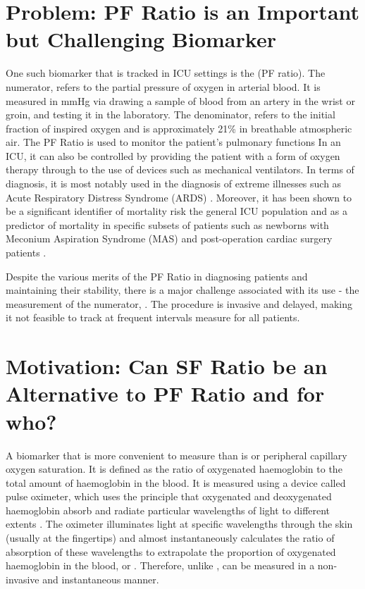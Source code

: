 \section{Problem: PF Ratio is an Important but Challenging Biomarker}

One such biomarker that is tracked in ICU settings is the  \PF(PF ratio). The numerator, \Pa refers to the partial pressure of oxygen in arterial blood. It is measured in mmHg via drawing a sample of blood from an artery in the wrist or groin, and testing it in the laboratory. The denominator, \Fi refers to the initial fraction of inspired oxygen and is approximately 21\% in breathable atmospheric air. The PF Ratio is used to monitor the patient's pulmonary functions In an ICU, it can also be controlled by providing the patient with a form of oxygen therapy through to the use of devices such as mechanical ventilators. In terms of diagnosis, it is most notably used in the diagnosis of extreme illnesses such as Acute Respiratory Distress Syndrome (ARDS) \citep{bernard1994american}. Moreover, it has been shown to be a significant identifier of mortality risk the general ICU population \citep{villar2011risk} and as a predictor of mortality in specific subsets of patients such as newborns with Meconium Aspiration Syndrome (MAS)  \citep{narayanan2019pao2} and post-operation cardiac surgery patients \citep{esteve2014evaluation}.

Despite the various merits of the PF Ratio in diagnosing patients and maintaining their stability, there is a major challenge associated with its use - the measurement of the numerator, \Pa. The  procedure is invasive and delayed, making it not feasible to track \Pa at frequent intervals measure for all patients. 


\section{Motivation: Can SF Ratio be an Alternative to PF Ratio and for who?}
A biomarker that is more convenient to measure than \Pa is \Sp or peripheral capillary oxygen saturation. It is defined as the ratio of oxygenated haemoglobin to the total amount of haemoglobin in the blood. It is measured using a device called pulse oximeter, which uses the principle that oxygenated and deoxygenated haemoglobin absorb and radiate particular wavelengths of light to different extents \citep{jubran1999pulse} . The oximeter illuminates light at specific wavelengths through the skin (usually at the fingertips) and almost instantaneously calculates the ratio of absorption of these wavelengths to extrapolate the proportion of oxygenated haemoglobin in the blood, or \Sp \citep{jubran2015}. Therefore, unlike \Pa, \Sp can be measured in a non-invasive and instantaneous manner. 

